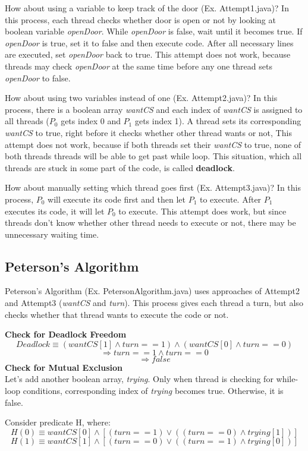 \documentclass[twoside]{article}
\begin{document}
How about using a variable to keep track of the door (Ex. Attempt1.java)?
In this process, each thread checks whether door is open or not by looking at boolean variable {\it openDoor}.
While {\it openDoor} is false, wait until it becomes true.
If {\it openDoor} is true, set it to false and then execute code.
After all necessary lines are executed, set {\it openDoor} back to true.
This attempt does not work, because threads may check {\it openDoor} at the same time before any one thread sets {\it openDoor} to false.

How about using two variables instead of one (Ex. Attempt2.java)?
In this process, there is a boolean array {\it wantCS} and each index of {\it wantCS} is assigned to all threads ($P_0$ gets index 0 and $P_1$ gets index 1).
A thread sets its corresponding {\it wantCS} to true, right before it checks whether other thread wants or not,  
This attempt does not work, because if both threads set their {\it wantCS} to true, none of both threads threads will be able to get past while loop.
This situation, which all threads are stuck in some part of the code, is called {\bf deadlock}.

How about manually setting which thread goes first (Ex. Attempt3.java)?
In this process, $P_0$ will execute its code first and then let $P_1$ to execute.
After $P_1$ executes its code, it will let $P_0$ to execute.
This attempt does work, but since threads don't know whether other thread needs to execute or not, there may be unnecessary waiting time.

\subsection{Peterson's Algorithm}
Peterson's Algorithm (Ex. PetersonAlgorithm.java) uses approaches of Attempt2 and Attempt3 ({\it wantCS} and {\it turn}).
This process gives each thread a turn, but also checks whether that thread wants to execute the code or not.

{\bf Check for Deadlock Freedom}
\[Deadlock \equiv (wantCS[1] \wedge turn == 1) \wedge (wantCS[0] \wedge turn == 0)\]
\[\Rightarrow turn == 1 \wedge turn == 0\]
\[\Rightarrow false\]
{\bf Check for Mutual Exclusion}\\
Let's add another boolean array, {\it trying}.
Only when thread is checking for while-loop conditions, corresponding index of {\it trying} becomes true.
Otherwise, it is false.

Consider predicate H, where:
\[H(0) \equiv wantCS[0] \wedge [(turn == 1) \vee ((turn == 0) \wedge trying[1])]\]
\[H(1) \equiv wantCS[1] \wedge [(turn == 0) \vee ((turn == 1) \wedge trying[0])]\]
\end{document}
